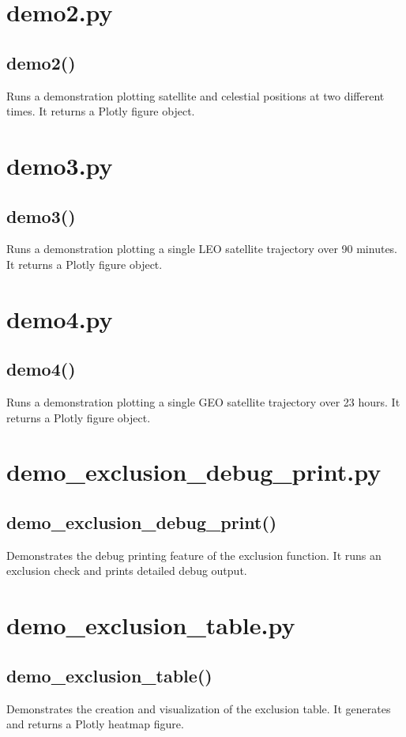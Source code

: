 \documentclass{article}
\begin{document}
\section*{demo2.py}
\subsection*{demo2()}
Runs a demonstration plotting satellite and celestial positions at two different times. It returns a Plotly figure object.

\section*{demo3.py}
\subsection*{demo3()}
Runs a demonstration plotting a single LEO satellite trajectory over 90 minutes. It returns a Plotly figure object.

\section*{demo4.py}
\subsection*{demo4()}
Runs a demonstration plotting a single GEO satellite trajectory over 23 hours. It returns a Plotly figure object.

\section*{demo\_exclusion\_debug\_print.py}
\subsection*{demo\_exclusion\_debug\_print()}
Demonstrates the debug printing feature of the exclusion function. It runs an exclusion check and prints detailed debug output.

\section*{demo\_exclusion\_table.py}
\subsection*{demo\_exclusion\_table()}
Demonstrates the creation and visualization of the exclusion table. It generates and returns a Plotly heatmap figure.
\end{document}
